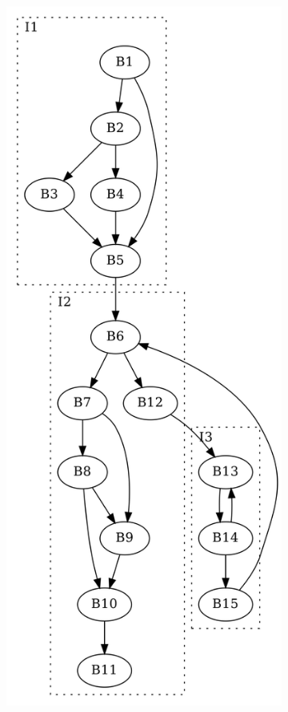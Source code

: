 \begin{figure}[htbp]
	\centering
	\begin{subfigure}[b]{0.30\textwidth}
		\centering
		\includegraphics[width=\textwidth]{inc/3_background/interval_method/derived_sequence_of_graphs/G_1.png}

\end{subfigure}
\end{figure}
